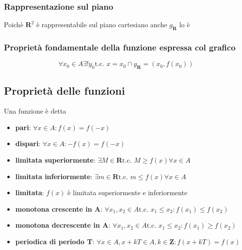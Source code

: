         \subsubsection{Rappresentazione sul piano}
            Poichè $\mathbf{R}^2$ è rappresentabile sul piano cartesiano anche 
            $g_{\mathbf{R}}$ lo è
        \subsubsection{Proprietà fondamentale della funzione espressa col grafico}
        $$\forall x_0 \in A \exists!y_0 \textrm{t.c. } {x = x_0} \cap {g_{\mathbf{R}}}
            = {(x_0, f(x_0))}$$
    \subsection{Proprietà delle funzioni}
        Una funzione è detta
        \begin{itemize}
            \item \textbf{pari}: $\forall x \in A: f(x) = f(-x)$
            \item \textbf{dispari}: $\forall x \in A: -f(x) = f(-x)$
            \item \textbf{limitata superiormente}: $\exists M \in \mathbf{R} 
                \textrm{t.c. } M \geq f(x) \forall x \in A$
            \item \textbf{limitata inferiormente}: $\exists m \in \mathbf{R} 
                \textrm{t.c. } m \leq f(x) \forall x \in A$
            \item \textbf{limitata}: $f(x)$ è limitata superiormente e inferiormente
            \item \textbf{monotona crescente in A}: $\forall x_1, x_2 \in A \textrm{t.c. } 
                x_1 \leq x_2: f(x_1) \leq f(x_2)$
            \item \textbf{monotona decrescente in A}: $\forall x_1, x_2 \in A \textrm{t.c. } 
                x_1 \leq x_2: f(x_1) \geq f(x_2)$
            \item \textbf{periodica di periodo T}: $\forall x \in A, x + kT \in A, 
                k \in \mathbf{Z}: f(x + kT) = f(x)$
        \end{itemize}
